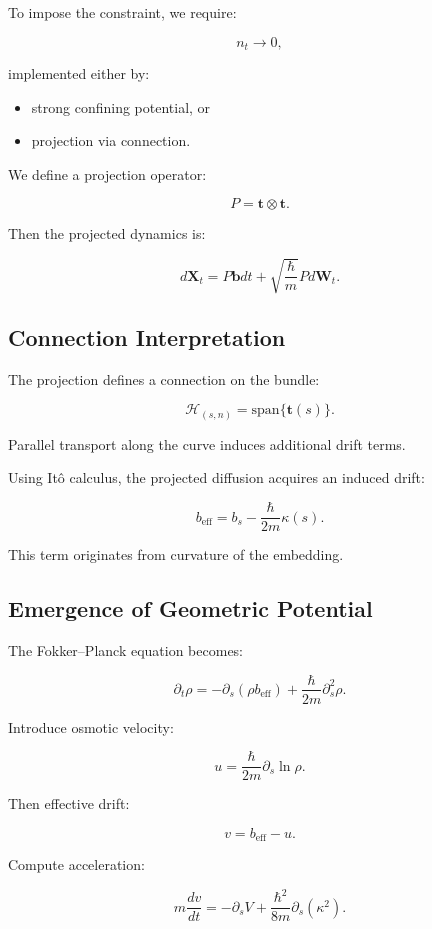 \documentclass[11pt]{article}
\begin{document}
To impose the constraint, we require:

\[
n_t \to 0,
\]

implemented either by:

\begin{itemize}
\item strong confining potential, or
\item projection via connection.
\end{itemize}

We define a projection operator:

\[
P = \mathbf{t} \otimes \mathbf{t}.
\]

Then the projected dynamics is:

\[
d\mathbf{X}_t = P \mathbf{b} dt + \sqrt{\frac{\hbar}{m}} P d\mathbf{W}_t.
\]

\subsection{Connection Interpretation}

The projection defines a connection on the bundle:

\[
\mathcal{H}_{(s,n)} = \mathrm{span}\{\mathbf{t}(s)\}.
\]

Parallel transport along the curve induces additional drift terms.

Using It\^o calculus, the projected diffusion acquires an induced drift:

\[
b_{\mathrm{eff}} = b_s - \frac{\hbar}{2m}\kappa(s).
\]

This term originates from curvature of the embedding.

\subsection{Emergence of Geometric Potential}

The Fokker--Planck equation becomes:

\[
\partial_t \rho = -\partial_s(\rho b_{\mathrm{eff}})
+ \frac{\hbar}{2m}\partial_s^2 \rho.
\]

Introduce osmotic velocity:

\[
u = \frac{\hbar}{2m} \partial_s \ln \rho.
\]

Then effective drift:

\[
v = b_{\mathrm{eff}} - u.
\]

Compute acceleration:

\[
m\frac{dv}{dt} = -\partial_s V + \frac{\hbar^2}{8m}\partial_s(\kappa^2).
\]
\end{document}
